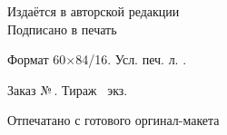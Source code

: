 \newpage
\thispagestyle{empty}
~\vfill
\begin{centering}
  \textit{\EdType}\\[18pt]
  \AuthorI\\[6pt]
  {\large\Title}\\[6pt]
  \PubType\\[18pt]
  Издаётся в авторской редакции\\
  \vspace{18pt}
  Подписано в печать \PUBDATE

  Формат 60×84/16. Усл. печ. л. \SHEETS.
  
  Заказ №\,\PUBORDER. Тираж \PUBCOUNT\ экз.

  \vspace{6pt}

  Отпечатано с готового оргинал-макета

  \PUBLISHER

  \PUBADDR
\end{centering}
\vspace{1cm}
